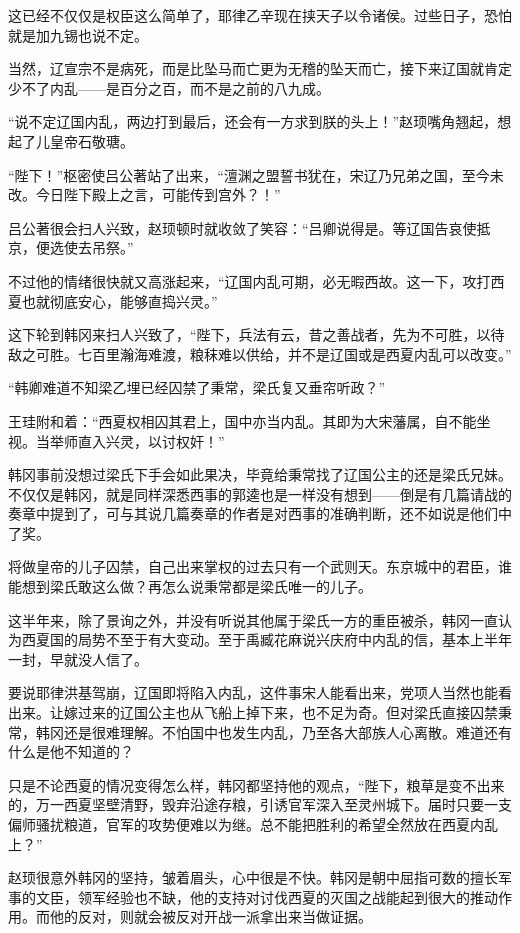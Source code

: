 这已经不仅仅是权臣这么简单了，耶律乙辛现在挟天子以令诸侯。过些日子，恐怕就是加九锡也说不定。

当然，辽宣宗不是病死，而是比坠马而亡更为无稽的坠天而亡，接下来辽国就肯定少不了内乱——是百分之百，而不是之前的八九成。

“说不定辽国内乱，两边打到最后，还会有一方求到朕的头上！”赵顼嘴角翘起，想起了儿皇帝石敬瑭。

“陛下！”枢密使吕公著站了出来，“澶渊之盟誓书犹在，宋辽乃兄弟之国，至今未改。今日陛下殿上之言，可能传到宫外？！”

吕公著很会扫人兴致，赵顼顿时就收敛了笑容：“吕卿说得是。等辽国告哀使抵京，便选使去吊祭。”

不过他的情绪很快就又高涨起来，“辽国内乱可期，必无暇西故。这一下，攻打西夏也就彻底安心，能够直捣兴灵。”

这下轮到韩冈来扫人兴致了，“陛下，兵法有云，昔之善战者，先为不可胜，以待敌之可胜。七百里瀚海难渡，粮秣难以供给，并不是辽国或是西夏内乱可以改变。”

“韩卿难道不知梁乙埋已经囚禁了秉常，梁氏复又垂帘听政？”

王珪附和着：“西夏权相囚其君上，国中亦当内乱。其即为大宋藩属，自不能坐视。当举师直入兴灵，以讨权奸！”

韩冈事前没想过梁氏下手会如此果决，毕竟给秉常找了辽国公主的还是梁氏兄妹。不仅仅是韩冈，就是同样深悉西事的郭逵也是一样没有想到——倒是有几篇请战的奏章中提到了，可与其说几篇奏章的作者是对西事的准确判断，还不如说是他们中了奖。

将做皇帝的儿子囚禁，自己出来掌权的过去只有一个武则天。东京城中的君臣，谁能想到梁氏敢这么做？再怎么说秉常都是梁氏唯一的儿子。

这半年来，除了景询之外，并没有听说其他属于梁氏一方的重臣被杀，韩冈一直认为西夏国的局势不至于有大变动。至于禹臧花麻说兴庆府中内乱的信，基本上半年一封，早就没人信了。

要说耶律洪基驾崩，辽国即将陷入内乱，这件事宋人能看出来，党项人当然也能看出来。让嫁过来的辽国公主也从飞船上掉下来，也不足为奇。但对梁氏直接囚禁秉常，韩冈还是很难理解。不怕国中也发生内乱，乃至各大部族人心离散。难道还有什么是他不知道的？

只是不论西夏的情况变得怎么样，韩冈都坚持他的观点，“陛下，粮草是变不出来的，万一西夏坚壁清野，毁弃沿途存粮，引诱官军深入至灵州城下。届时只要一支偏师骚扰粮道，官军的攻势便难以为继。总不能把胜利的希望全然放在西夏内乱上？”

赵顼很意外韩冈的坚持，皱着眉头，心中很是不快。韩冈是朝中屈指可数的擅长军事的文臣，领军经验也不缺，他的支持对讨伐西夏的灭国之战能起到很大的推动作用。而他的反对，则就会被反对开战一派拿出来当做证据。

